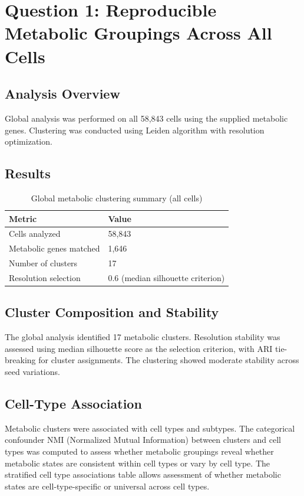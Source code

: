 \documentclass[11pt]{article}
\begin{document}
\section{Question 1: Reproducible Metabolic Groupings Across All Cells}

\subsection{Analysis Overview}
Global analysis was performed on all 58,843 cells using the supplied metabolic genes. Clustering was conducted using Leiden algorithm with resolution optimization.

\subsection{Results}
\begin{table}[h]
\centering
\caption{Global metabolic clustering summary (all cells)}
\label{tab:global_summary}
\begin{tabular}{ll}
\toprule
\textbf{Metric} & \textbf{Value} \\
\midrule
Cells analyzed & 58,843 \\
Metabolic genes matched & 1,646 \\
Number of clusters & 17 \\
Resolution selection & 0.6 (median silhouette criterion) \\
\bottomrule
\end{tabular}
\end{table}

\subsection{Cluster Composition and Stability}
The global analysis identified 17 metabolic clusters. Resolution stability was assessed using median silhouette score as the selection criterion, with ARI tie-breaking for cluster assignments. The clustering showed moderate stability across seed variations.

\subsection{Cell-Type Association}
Metabolic clusters were associated with cell types and subtypes. The categorical confounder NMI (Normalized Mutual Information) between clusters and cell types was computed to assess whether metabolic groupings reveal whether metabolic states are consistent within cell types or vary by cell type. The stratified cell type associations table allows assessment of whether metabolic states are cell-type-specific or universal across cell types.
\end{document}
